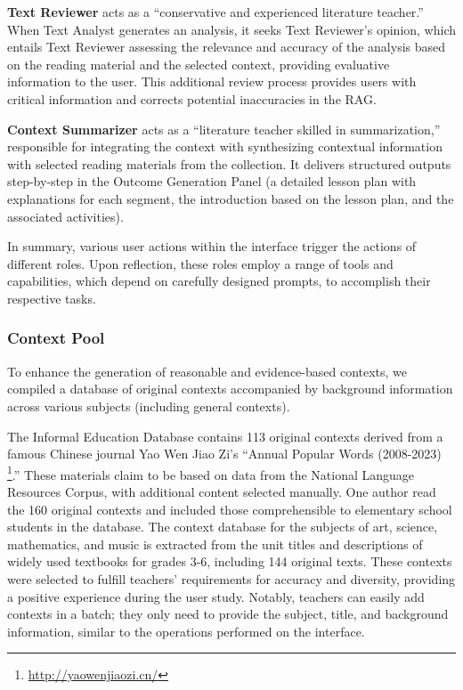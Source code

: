 \textbf{Text Reviewer} acts as a ``conservative and experienced literature teacher.'' When Text Analyst generates an analysis, it seeks Text Reviewer's opinion, which entails Text Reviewer assessing the relevance and accuracy of the analysis based on the reading material and the selected context, providing evaluative information to the user. This additional review process provides users with critical information and corrects potential inaccuracies in the RAG.

\textbf{Context Summarizer} acts as a ``literature teacher skilled in summarization,'' responsible for integrating the context with synthesizing contextual information with selected reading materials from the collection. It delivers structured outputs step-by-step in the Outcome Generation Panel (\ie a detailed lesson plan with explanations for each segment, the introduction based on the lesson plan, and the associated activities).

In summary, various user actions within the interface trigger the actions of different roles. Upon reflection, these roles employ a range of tools and capabilities, which depend on carefully designed prompts, to accomplish their respective tasks.

\subsubsection{Context Pool}
\label{sbsbsc:contextpool}
To enhance the generation of reasonable and evidence-based contexts, we compiled a database of original contexts accompanied by background information across various subjects (including general contexts). 

The Informal Education Database contains 113 original contexts derived from a famous Chinese journal Yao Wen Jiao Zi's ``Annual Popular Words (2008-2023) \footnote{\url{http://yaowenjiaozi.cn/}}.''
These materials claim to be based on data from the National Language Resources Corpus, with additional content selected manually. 
One author read the 160 original contexts and included those comprehensible to elementary school students in the database. 
The context database for the subjects of art, science, mathematics, and music is extracted from the unit titles and descriptions of widely used textbooks for grades 3-6, including 144 original texts.
These contexts were selected to fulfill teachers' requirements for accuracy and diversity, providing a positive experience during the user study. Notably, teachers can easily add contexts in a batch; they only need to provide the subject, title, and background information, similar to the operations performed on the interface.

